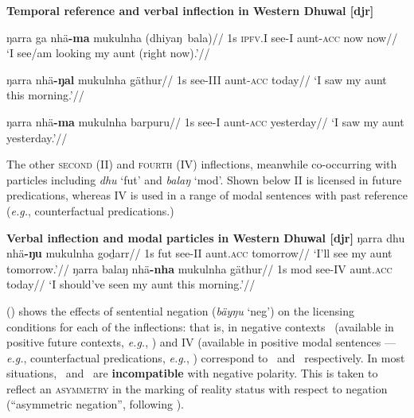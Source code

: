 \pex \textbf{Temporal reference and verbal inflection in Western Dhuwal [\gls{djr}]}

\a\begingl\gla {}ŋarra ga nhä\textbf{-ma} mukulnha (dhiyaŋ~bala)//
\glb  1s \textsc{ipfv.\gls{I}} see-\gls{I} aunt-\textsc{acc} now now//
\glft`I see/am looking my aunt (right now).'//\endgl


\a\begingl\gla  {}ŋarra nhä\textbf{-ŋal} mukulnha gäthur//
\glb 1s see-\gls{III} aunt-\textsc{acc} today//
\glft`I saw my aunt this morning.'//\endgl 

\a\begingl\gla {}ŋarra nhä\textbf{-ma} mukulnha barpuru//
\glb 1s see-\gls{I} aunt-\textsc{acc} yesterday//
\glft`I saw my aunt yesterday.'//\endgl\xe


The other \textsc{second} (\gls{II}) and \textsc{fourth} (\gls{IV}) inflections, meanwhile co-occurring with particles including \textit{dhu} `\gls{fut}' and \textit{balaŋ} `\gls{mod}'. Shown below \gls{II} is licensed in future predications, whereas \gls{IV} is used in a range of modal sentences with past reference (\textit{e.g.}, counterfactual predications.) 


\pex\textbf{Verbal inflection and modal particles in Western Dhuwal [\gls{djr}]}
\a\begingl
\gla {}ŋarra dhu nhä\textbf{-ŋu} mukulnha goḏarr//
\glb 1s \gls{fut} see-\gls{II} aunt.\textsc{acc} tomorrow//
\glft`I'll see my aunt tomorrow.'//\endgl
\a\begingl\gla {}ŋarra balaŋ nhä\textbf{-nha} mukulnha gäthur//
\glb 1s \gls{mod} see-\gls{IV} aunt.\textsc{acc} today//
\glft`I should've seen my aunt this morning.'//\endgl
\xe


() shows the effects of sentential negation (\textit{bäyŋu} `\gls{neg}') on the licensing conditions for each of the inflections: that is, in negative contexts \II\ (available in positive future contexts, \textit{e.g.}, ) and \gls{IV} (available in positive modal sentences --- \textit{e.g.}, counterfactual predications, \textit{e.g.}, ) correspond to \I\ and \III\ respectively. In most situations, \I~and \III~are \textbf{incompatible} with negative polarity. This is taken to reflect an \textsc{asymmetry} in the marking of reality status with respect to negation (``asymmetric negation'', following \citealp{Miestamo2005}).

